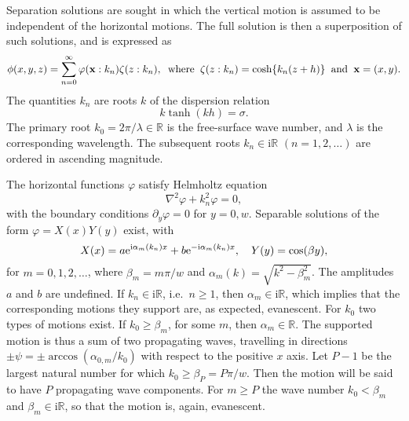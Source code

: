 \documentclass[12pt,a4paper]{article}
\def\ci{{\mathrm i}}
\renewcommand{\exp}{{\rm e}}
\newcommand{\ie}{i.e.\ }
\newcommand{\vp}{{\phi}}
\newcommand{\vph}{{\varphi}}
\newcommand{\fp}{{\sigma}}
\newcommand{\vm}{{\zeta}}
\newcommand{\ang}{{\psi}}
\newcommand{\kx}{\alpha}
\newcommand{\ky}{\beta}
\newcommand{\bx}{{\bf x}}
\begin{document}
Separation solutions are sought in which the vertical motion is assumed to be independent of the horizontal motions.
The full solution is then a superposition of such solutions, and is expressed as
\begin{equation} 
\vp(x,y,z)
=
\sum_{n=0}^{\infty}
\vph(\bx :k_{n})
\vm(z:k_{n})
,
\;\;
\text{where}
\;\;
\vm(z:k_{n})=\cosh\{k_{n}(z+h)\}
\;\;
\text{and}
\;\;
\bx
=
(x,y).
\end{equation}
The quantities $k_{n}$ are roots $k$ of the dispersion relation
\begin{equation}
k\tanh(kh)=\fp.
\end{equation}
The primary root $k_{0}=2\pi/\lambda\in\mathbb{R}$ is the free-surface wave number, and $\lambda$ is the corresponding wavelength.
The subsequent roots $k_{n}\in\ci\mathbb{R}$ $(n=1,2,\dots)$  are ordered in ascending magnitude.

The horizontal functions $\vph$ satisfy Helmholtz equation
\begin{equation}
\nabla^{2} 
\vph
+
k_{n}^{2}\vph
=0,
\end{equation}
with the boundary conditions $\partial_{y}\vph=0$ for $y=0,w$.
Separable solutions of the form $\vph=X(x)Y(y)$ exist, with
\begin{equation}
X(x)
=
a\exp^{\ci\kx_{m}(k_{n}) x}
+
b\exp^{-\ci\kx_{m}(k_{n}) x}
,
\quad
Y(y)
=
\cos(\ky y)
,
\end{equation}
for $m=0,1,2,\dots$, where $\ky_{m}=m\pi/w$ and $\kx_{m}(k)=\sqrt{k^{2}-\ky_{m}^{2}}$.
The amplitudes $a$ and $b$ are undefined.
If $k_{n}\in\ci\mathbb{R}$, \ie $n\geq 1$, then $\kx_{m}\in\ci\mathbb{R}$, which implies that the corresponding motions they support are, as expected, evanescent. 
For $k_{0}$ two types of motions exist.
If $k_{0}\geq \ky_{m}$, for some $m$, then $\kx_{m}\in\mathbb{R}$. The supported motion is thus a sum of two propagating waves, travelling in directions $\pm\ang=\pm\arccos(\kx_{0,m}/k_{0})$ with respect to the positive $x$ axis.
Let $P-1$ be the largest natural number for which $k_{0}\geq \ky_{P}=P\pi/w$. Then the motion will be said to have $P$ propagating wave components.
For $m\geq P$ the wave number $k_{0}<\ky_{m}$ and $\ky_{m}\in\ci\mathbb{R}$, so that the motion is, again, evanescent.
\end{document}
